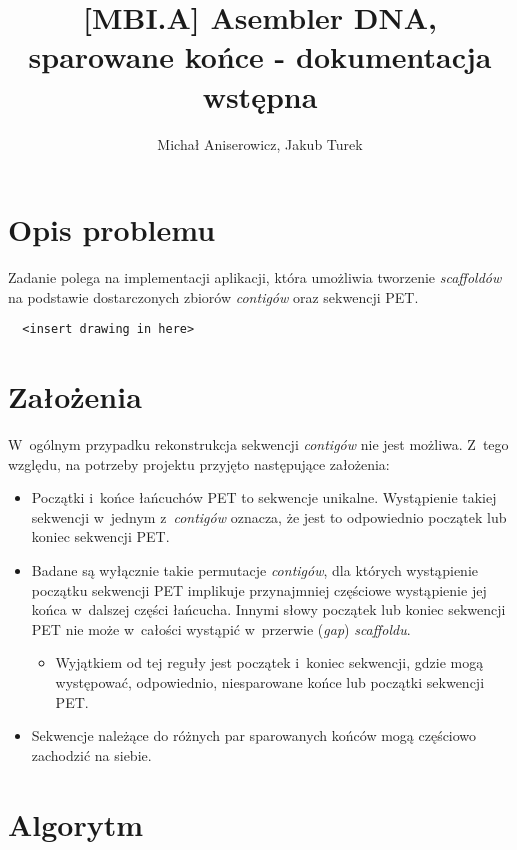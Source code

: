\documentclass[a4paper,10pt]{article}
\title{[MBI.A] Asembler DNA, sparowane końce - dokumentacja wstępna}
\author{Michał Aniserowicz, Jakub Turek}
\date{}
\begin{document}
\maketitle

\section*{Opis problemu}

Zadanie polega na implementacji aplikacji, która umożliwia tworzenie \emph{scaffoldów} na podstawie dostarczonych zbiorów \emph{contigów} oraz sekwencji PET. 

\begin{verbatim}
  <insert drawing in here>
\end{verbatim}

\section*{Założenia}

W~ogólnym przypadku rekonstrukcja sekwencji \emph{contigów} nie jest możliwa. Z~tego względu, na potrzeby projektu przyjęto następujące założenia:

\begin{itemize}
  \item Początki i~końce łańcuchów PET to sekwencje unikalne. Wystąpienie takiej sekwencji w~jednym z~\emph{contigów} oznacza, że jest to odpowiednio początek lub koniec sekwencji PET.
  \item Badane są wyłącznie takie permutacje \emph{contigów}, dla których wystąpienie początku sekwencji PET implikuje przynajmniej częściowe wystąpienie jej końca w~dalszej części łańcucha. Innymi słowy początek lub koniec sekwencji PET nie może w~całości wystąpić w~przerwie (\emph{gap}) \emph{scaffoldu}.
  
    \begin{itemize}
	  \item Wyjątkiem od tej reguły jest początek i~koniec sekwencji, gdzie mogą występować, odpowiednio, niesparowane końce lub początki sekwencji PET.
    \end{itemize}
  
  \item Sekwencje należące do różnych par sparowanych końców mogą częściowo zachodzić na siebie.
\end{itemize}

\section*{Algorytm}
\end{document}
